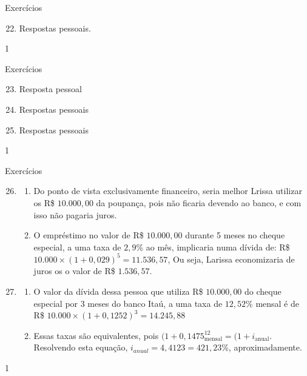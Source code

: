\clearmargin
\begin{answer}{Exercícios}
{\exerciselist

  \begin{enumerate}\setcounter{enumi}{21}
    \item Respostas pessoais.
  \end{enumerate}
}{1}
\end{answer}
\clearmargin
\begin{answer}{Exercícios}
{\exerciselist

  \begin{enumerate}\setcounter{enumi}{22}
    \item Resposta pessoal
    \item Respostas pessoais
    \item Respostas pessoais
  \end{enumerate}
}{1}
\end{answer}
\clearmargin
\begin{answer}{Exercícios}
{\exerciselist

  \begin{enumerate}\setcounter{enumi}{25}
    \item 
    \begin{enumerate}
      \item Do ponto de vista exclusivamente financeiro, seria melhor Lrissa utilizar os R\$ $10.000{,}00$ da poupança, pois não ficaria devendo ao banco, e com isso não pagaria juros.

      \item O empréstimo no valor de R\$ $10.000{,}00$ durante 5 meses no cheque especial, a uma taxa de $2{,}9$\% ao mês, implicaria numa dívida de: R\$ $10.000\times(1+0{,}029)^5=11.536{,}57$, Ou seja, Larissa economizaria de juros os o valor de R\$ $1.536{,}57$.
    \end{enumerate}
    \item
    \begin{enumerate}
      \item O valor da dívida dessa pessoa que utiliza R\$ $10.000{,}00$ do cheque especial por 3 meses do banco Itaú, a uma taxa de $12{,}52$\% mensal é de R\$ $10.000\times (1+0{,}1252)^3=14.245{,}88$
      \item Essas taxas são equivalentes, pois $(1+0{,}1475_{\text{mensal}}^{12}=(1+i_{\text{anual}}$. Resolvendo esta equação, $i_{anual}=4{,}4123=421{,}23$\%, aproximadamente.
    \end{enumerate}
    

  \end{enumerate}
}{1}
\end{answer}

